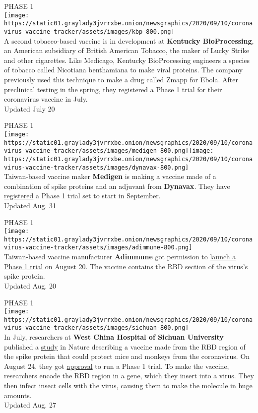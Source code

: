 PHASE 1\\
\texttt{[image: https://static01.graylady3jvrrxbe.onion/newsgraphics/2020/09/10/coronavirus-vaccine-tracker/assets/images/kbp-800.png]}\\
A second tobacco-based vaccine is in development at
\textbf{\textbf{Kentucky BioProcessing}}, an American subsidiary of
British American Tobacco, the maker of Lucky Strike and other
cigarettes. Like Medicago, Kentucky BioProcessing engineers a species of
tobacco called Nicotiana benthamiana to make viral proteins. The company
previously used this technique to make a drug called Zmapp for Ebola.
After preclinical testing in the spring, they registered a Phase 1 trial
for their coronavirus vaccine in July.\\
Updated July 20

PHASE 1\\
\texttt{[image: https://static01.graylady3jvrrxbe.onion/newsgraphics/2020/09/10/coronavirus-vaccine-tracker/assets/images/medigen-800.png]}\texttt{[image: https://static01.graylady3jvrrxbe.onion/newsgraphics/2020/09/10/coronavirus-vaccine-tracker/assets/images/dynavax-800.png]}\\
Taiwan-based vaccine maker \textbf{\textbf{Medigen}} is making a vaccine
made of a combination of spike proteins and an adjuvant from
\textbf{\textbf{Dynavax}}. They have
\href{https://clinicaltrials.gov/ct2/show/NCT04487210?term=vaccine\&recrs=abdf\&cond=COVID-19\&phase=0123\&sort=nwst\&draw=2\&rank=5}{registered}
a Phase 1 trial set to start in September.\\
Updated Aug. 31

PHASE 1\\
\texttt{[image: https://static01.graylady3jvrrxbe.onion/newsgraphics/2020/09/10/coronavirus-vaccine-tracker/assets/images/adimmune-800.png]}\\
Taiwan-based vaccine manufacturer \textbf{\textbf{Adimmune}} got
permission to \href{https://focustaiwan.tw/sci-tech/202008200011}{launch
a Phase 1 trial} on August 20. The vaccine contains the RBD section of
the virus's spike protein.\\
Updated Aug. 20

PHASE 1\\
\texttt{[image: https://static01.graylady3jvrrxbe.onion/newsgraphics/2020/09/10/coronavirus-vaccine-tracker/assets/images/sichuan-800.png]}\\
In July, researchers at \textbf{\textbf{West China Hospital of Sichuan
University}} published a
\href{https://www.nature.com/articles/s41586-020-2599-8}{study} in
Nature describing a vaccine made from the RBD region of the spike
protein that could protect mice and monkeys from the coronavirus. On
August 24, they got
\href{http://en.nhc.gov.cn/2020-08/26/c_81483.htm}{approval} to run a
Phase 1 trial. To make the vaccine, researchers encode the RBD region in
a gene, which they insert into a virus. They then infect insect cells
with the virus, causing them to make the molecule in huge amounts.\\
Updated Aug. 27

